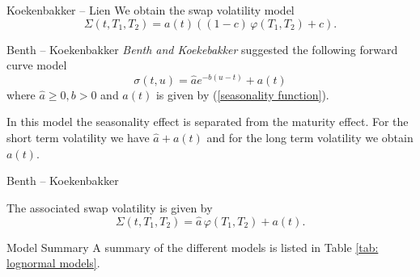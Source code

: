 {Koekenbakker -- Lien}
We obtain the swap volatility model
\begin{equation}
\Sigma(t,T_1,T_2)=a(t) ((1-c)\, \varphi(T_1,T_2)+c).
\end{equation}

{Benth -- Koekenbakker}
\emph{Benth and Koekebakker} suggested the following forward curve model
\begin{equation}
\sigma(t,u)=\hat{a} e^{-b(u-t)}+a(t)
\end{equation}
where $\hat{a} \ge 0, b>0$ and $a(t)$ is given by (\ref{seasonality function}).

In this model the seasonality effect is separated from the maturity effect. For the short term volatility we have $\hat{a}+a(t)$ and for the long term volatility we obtain $a(t)$.

{Benth -- Koekenbakker}

The associated swap volatility is given by
\begin{equation}
\Sigma(t,T_1,T_2)=\hat{a}\, \varphi(T_1,T_2) +a(t).
\end{equation}

{Model Summary}
A summary of the different models  is listed in Table \ref{tab: lognormal models}.
\begin{table}[h]
 \small {}
    \caption[Swap Volatility Models]
    {\small The associated swap volatility models generated by (\ref{eqn: swap volatility creation}) with $a \ge 0, b > 0$ and $0 \le c \le 1$ constants, $a(t)$ defined in (\ref{seasonality function}) and $\varphi(T_1,T_2)$ is given by (\ref{volatility function varphi}). }
    \label{tab: lognormal models}
\end{table}

